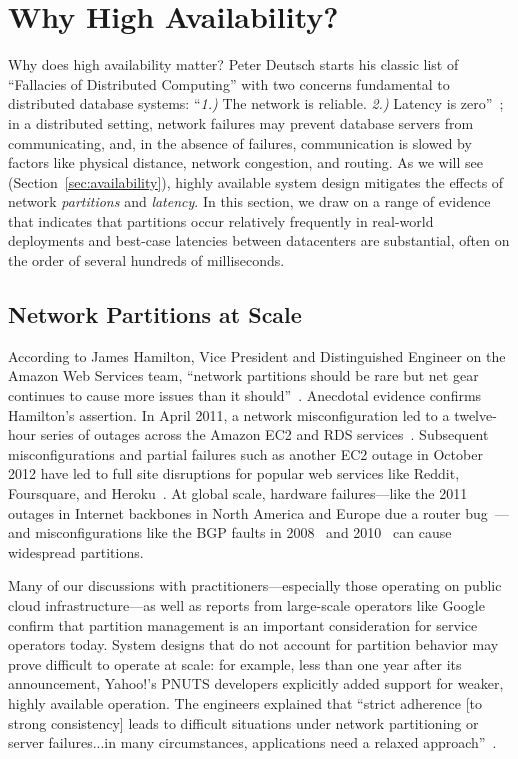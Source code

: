 
\section{Why High Availability?}
\label{sec:motivation}

Why does high availability matter? Peter Deutsch starts his classic
list of ``Fallacies of Distributed Computing'' with two concerns
fundamental to distributed database systems: ``\textit{1.)}  The
network is reliable. \textit{2.)} Latency is
zero''~\cite{fallacies-deutsch}; in a distributed setting, network
failures may prevent database servers from communicating, and, in the
absence of failures, communication is slowed by factors like physical
distance, network congestion, and routing. As we will see
(Section~\ref{sec:availability}), highly available system design
mitigates the effects of network \textit{partitions} and
\textit{latency}. In this section, we draw on a range of evidence that
indicates that partitions occur relatively frequently in real-world
deployments and best-case latencies between datacenters are
substantial, often on the order of several hundreds of milliseconds.

\subsection{Network Partitions at Scale}

According to James Hamilton, Vice President and Distinguished Engineer
on the Amazon Web Services team, ``network partitions should be rare
but net gear continues to cause more issues than it
should''~\cite{hamilton-partitions}. Anecdotal evidence confirms
Hamilton's assertion. In April 2011, a network misconfiguration led to
a twelve-hour series of outages across the Amazon EC2 and RDS
services~\cite{amazon-netpartition}. Subsequent misconfigurations and
partial failures such as another EC2 outage in October 2012 have led
to full site disruptions for popular web services like Reddit,
Foursquare, and Heroku~\cite{ec2-downsites}. At global scale,
hardware failures---like the 2011 outages in Internet backbones in
North America and Europe due a router
bug~\cite{juniper-partition}---and misconfigurations like the BGP
faults in 2008~\cite{pakistan-youtube} and
2010~\cite{research-experiment-partition} can cause widespread
partitions.

Many of our discussions with practitioners---especially those
operating on public cloud infrastructure---as well as reports from
large-scale operators like Google~\cite{dean-keynote} confirm that
partition management is an important consideration for service
operators today. System designs that do not account for partition
behavior may prove difficult to operate at scale: for example, less
than one year after its announcement, Yahoo!'s PNUTS developers
explicitly added support for weaker, highly available operation. The
engineers explained that ``strict adherence [to strong consistency]
leads to difficult situations under network partitioning or server
failures...in many circumstances, applications need a relaxed
approach''~\cite{pnuts-update}.

